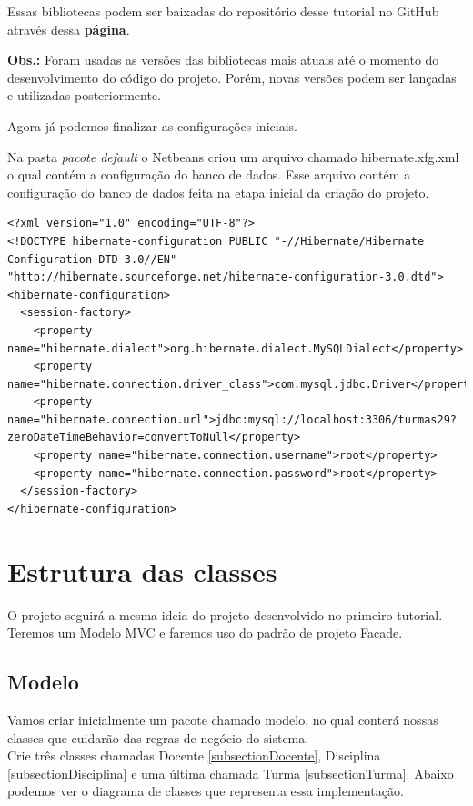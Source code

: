 \documentclass[12pt,a4paper]{article}
\begin{document}
Essas bibliotecas podem ser baixadas do repositório desse tutorial no GitHub através dessa \href{https://github.com/julianacalio/Tutorial2/blob/master/Bibliotecas.zip}{\textbf{página}}. 

\textbf{Obs.: }Foram usadas as versões das bibliotecas mais atuais até o momento do desenvolvimento do código do projeto. Porém, novas versões podem ser lançadas e utilizadas posteriormente.

    
Agora já podemos finalizar as configurações iniciais.

Na pasta \textit{pacote default} o Netbeans criou um arquivo chamado hibernate.xfg.xml o qual contém a configuração do banco de dados.
Esse arquivo contém a configuração do banco de dados feita na etapa inicial da criação do projeto.



\lstset{language=HTML}
\begin{lstlisting}
<?xml version="1.0" encoding="UTF-8"?>
<!DOCTYPE hibernate-configuration PUBLIC "-//Hibernate/Hibernate Configuration DTD 3.0//EN" "http://hibernate.sourceforge.net/hibernate-configuration-3.0.dtd">
<hibernate-configuration>
  <session-factory>
    <property name="hibernate.dialect">org.hibernate.dialect.MySQLDialect</property>
    <property name="hibernate.connection.driver_class">com.mysql.jdbc.Driver</property>
    <property name="hibernate.connection.url">jdbc:mysql://localhost:3306/turmas29?zeroDateTimeBehavior=convertToNull</property>
    <property name="hibernate.connection.username">root</property>
    <property name="hibernate.connection.password">root</property>
  </session-factory>
</hibernate-configuration>
\end{lstlisting}

\newpage
\section{Estrutura das classes}

O projeto seguirá a mesma ideia do projeto desenvolvido no primeiro tutorial. Teremos um Modelo MVC e faremos uso do padrão de projeto Facade.

\subsection{Modelo}
Vamos criar inicialmente um pacote chamado modelo, no qual conterá nossas classes que cuidarão das regras de negócio do sistema.\\
Crie três classes chamadas Docente \ref{subsectionDocente}, Disciplina \ref{subsectionDisciplina} e uma última chamada Turma \ref{subsectionTurma}. Abaixo podemos ver o diagrama de classes que representa essa implementação.\\
\end{document}
